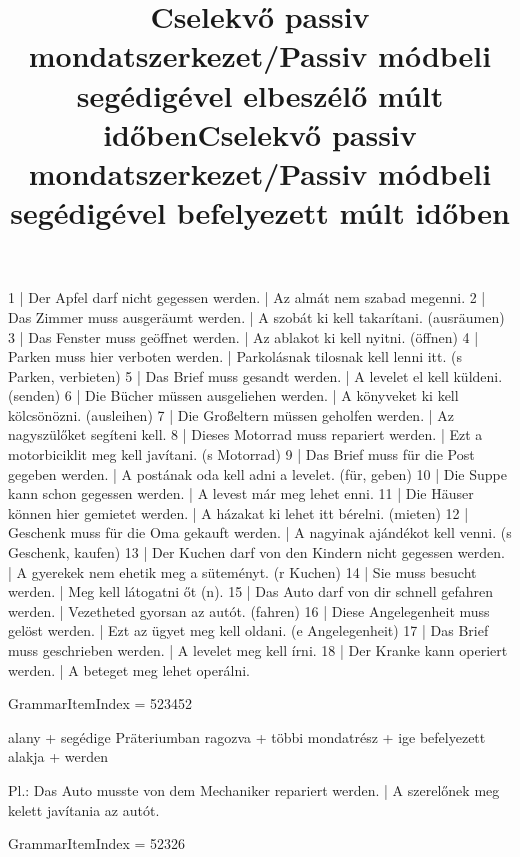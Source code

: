 \begin{exmp}
1 | Der Apfel darf nicht gegessen werden. | Az almát nem szabad megenni.
2 | Das Zimmer muss ausgeräumt werden. | A szobát ki kell takarítani. (ausräumen)
3 | Das Fenster muss geöffnet werden. | Az ablakot ki kell nyitni. (öffnen)
4 | Parken muss hier verboten werden. | Parkolásnak tilosnak kell lenni itt. (s Parken, verbieten)
5 | Das Brief muss gesandt werden. | A levelet el kell küldeni. (senden)
6 | Die Bücher müssen ausgeliehen werden. | A könyveket ki kell kölcsönözni. (ausleihen)
7 | Die Großeltern müssen geholfen werden. | Az nagyszülőket segíteni kell.
8 | Dieses Motorrad muss repariert werden. | Ezt a motorbiciklit meg kell javítani. (s Motorrad)
9 | Das Brief muss für die Post gegeben werden. | A postának oda kell adni a levelet. (für, geben)
10 | Die Suppe kann schon gegessen werden. | A levest már meg lehet enni.
11 | Die Häuser können hier gemietet werden. | A házakat ki lehet itt bérelni. (mieten)
12 | Geschenk muss für die Oma gekauft werden. | A nagyinak ajándékot kell venni. (s Geschenk, kaufen)
13 | Der Kuchen darf von den Kindern nicht gegessen werden. | A gyerekek nem ehetik meg a süteményt. (r Kuchen)
14 | Sie muss besucht werden. | Meg kell látogatni őt (n).
15 | Das Auto darf von dir schnell gefahren werden. | Vezetheted gyorsan az autót. (fahren)
16 | Diese Angelegenheit muss gelöst werden. | Ezt az ügyet meg kell oldani. (e Angelegenheit)
17 | Das Brief muss geschrieben werden. | A levelet meg kell írni.
18 | Der Kranke kann operiert werden. | A beteget meg lehet operálni.
\end{exmp}

\title{Cselekvő passiv mondatszerkezet/Passiv módbeli segédigével elbeszélő múlt időben}

GrammarItemIndex = 523452

\begin{desc}
alany + segédige Präteriumban ragozva + többi mondatrész + ige befelyezett alakja + werden

Pl.: Das Auto musste von dem Mechaniker repariert werden. | A szerelőnek meg kelett javítania az autót.
\end{desc}

\begin{exmp}
\end{exmp}

\title{Cselekvő passiv mondatszerkezet/Passiv módbeli segédigével befelyezett múlt időben}

GrammarItemIndex = 52326

